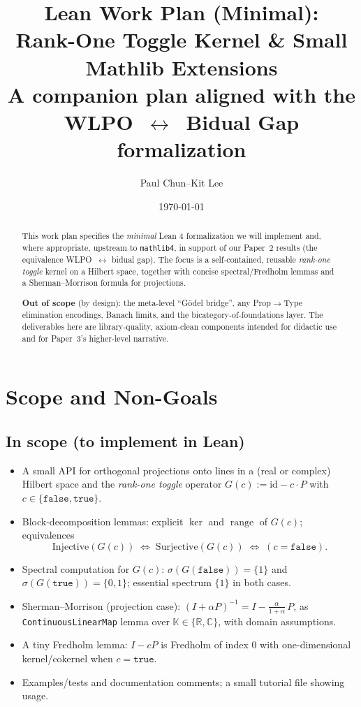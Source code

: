 \documentclass[11pt]{article}
\title{\textbf{Lean Work Plan (Minimal):\\
Rank-One Toggle Kernel \& Small Mathlib Extensions}\\
\large A companion plan aligned with the WLPO~\(\leftrightarrow\)~Bidual Gap formalization}
\author{Paul Chun--Kit Lee}
\date{\today}
\DeclareMathOperator{\range}{range}
\begin{document}
\maketitle

\begin{abstract}
This work plan specifies the \emph{minimal} Lean 4 formalization we will implement and, where appropriate, upstream to \texttt{mathlib4}, in support of our Paper~2 results (the equivalence WLPO~\(\leftrightarrow\) bidual gap). The focus is a self-contained, reusable \emph{rank-one toggle} kernel on a Hilbert space, together with concise spectral/Fredholm lemmas and a Sherman--Morrison formula for projections. 

\textbf{Out of scope} (by design): the meta-level ``Gödel bridge'', any Prop\(\to\)Type elimination encodings, Banach limits, and the bicategory-of-foundations layer. The deliverables here are library-quality, axiom-clean components intended for didactic use and for Paper~3's higher-level narrative.
\end{abstract}

\tableofcontents

\section{Scope and Non-Goals}\label{sec:scope}

\subsection*{In scope (to implement in Lean)}
\begin{itemize}
  \item A small API for orthogonal projections onto lines in a (real or complex) Hilbert space and the \emph{rank-one toggle} operator \(G(c) := \mathrm{id} - c\cdot P\) with \(c\in\{\texttt{false},\texttt{true}\}\).
  \item Block-decomposition lemmas: explicit \(\ker\) and \(\range\) of \(G(c)\); equivalences
  \[
    \mathrm{Injective}(G(c)) \;\Leftrightarrow\; \mathrm{Surjective}(G(c)) \;\Leftrightarrow\; (c=\texttt{false}).
  \]
  \item Spectral computation for \(G(c)\): \(\sigma(G(\texttt{false}))=\{1\}\) and \(\sigma(G(\texttt{true}))=\{0,1\}\); essential spectrum \(\{1\}\) in both cases.
  \item Sherman--Morrison (projection case): \((I+\alpha P)^{-1}=I-\tfrac{\alpha}{1+\alpha}\,P\), as \texttt{ContinuousLinearMap} lemma over \(\mathbb{K}\in\{\mathbb{R},\mathbb{C}\}\), with domain assumptions.
  \item A tiny Fredholm lemma: \(I - cP\) is Fredholm of index \(0\) with one-dimensional kernel/cokernel when \(c=\texttt{true}\).
  \item Examples/tests and documentation comments; a small tutorial file showing usage.
\end{itemize}
\end{document}
